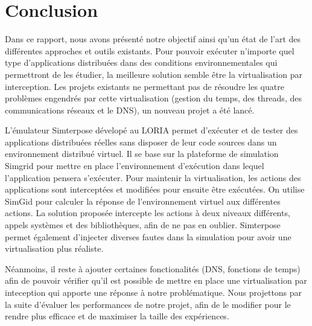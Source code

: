 \section{Conclusion}
Dans ce rapport, nous avons présenté notre objectif ainsi qu'un état de l'art
des différentes approches et outils existants. Pour pouvoir exécuter n'importe
quel type d'applications distribuées dans des conditions environnementales qui
permettront de les étudier, la meilleure solution semble être la virtualisation
par interception. Les projets existants ne permettant pas de résoudre les quatre
problèmes engendrés par cette virtualisation (gestion du temps, des threads, des
communications réseaux et le DNS), un nouveau projet a été lancé.

L'émulateur Simterpose dévelopé au LORIA permet d'exécuter et de tester des
applications distribuées réelles sans disposer de leur code sources dans un
environnement distribué virtuel. Il se base sur la plateforme de simulation
Simgrid pour mettre en place l'environnement d'exécution dans lequel
l'application pensera s'exécuter. Pour maintenir la virtualisation, les actions
des applications sont interceptées et modifiées pour ensuite être exécutées. On utilise SimGid pour calculer la réponse de l'environnement virtuel aux
différentes actions. La solution proposée intercepte les actions à deux niveaux
différents, appels systèmes et des bibliothèques, afin de ne pas en oublier. Simterpose permet également d'injecter diverses fautes dans la
simulation pour avoir une virtualisation plus réaliste.

Néanmoins, il reste à ajouter certaines fonctionalités (DNS, fonctions de temps)
afin de pouvoir vérifier qu'il est possible de mettre en place une
virtualisation par inteception qui apporte une réponse à notre
problématique. Nous projettons par la suite d'évaluer les performances de notre
projet, afin de le modifier pour le rendre plus efficace et de maximiser la
taille des expériences.

